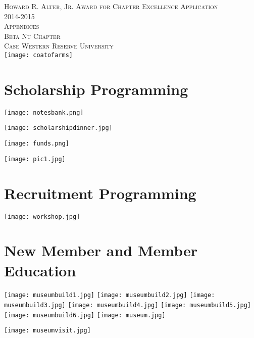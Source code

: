 \documentclass[a4paper,10pt]{article}
\begin{document}
  \begin{titlepage}
    \begin{center}
      \textsc{\Huge Howard R. Alter, Jr. Award for Chapter Excellence Application } \\[0.5cm]
      \textsc{\Huge 2014-2015} \\[1.0cm]
      \textsc{\LARGE Appendices} \\[1.0cm]
      \textsc{\Large Beta Nu Chapter} \\[0.3cm]
      \textsc{\Large Case Western Reserve University} \\[4.0cm]
      \texttt{[image: coatofarms]}
    \end{center}
  \end{titlepage}

  \tableofcontents
  \newpage
  
  \section{Scholarship Programming}
    \texttt{[image: notesbank.png]}
    
    \texttt{[image: scholarshipdinner.jpg]}
    
    \texttt{[image: funds.png]}
    
    
    \texttt{[image: pic1.jpg]}

    \newpage
  \section{Recruitment Programming}
    
    
    
    \texttt{[image: workshop.jpg]}
  
  \newpage
  \section{New Member and Member Education}
    \texttt{[image: museumbuild1.jpg]}
    \texttt{[image: museumbuild2.jpg]}
    \texttt{[image: museumbuild3.jpg]}
    \texttt{[image: museumbuild4.jpg]}
    \texttt{[image: museumbuild5.jpg]}
    \texttt{[image: museumbuild6.jpg]}
    \texttt{[image: museum.jpg]} \vspace{2.5cm}
    
    
    \texttt{[image: museumvisit.jpg]}
\end{document}
